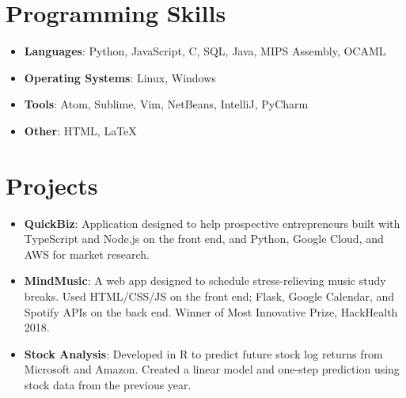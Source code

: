 \documentclass[letterpaper,12pt]{article}
\newcommand{\resumeItem}[2]{
  \item\small{
    \textbf{#1}{: #2 \vspace{-2pt}}
  }
}
\newcommand{\resumeSubItem}[2]{\resumeItem{#1}{#2}\vspace{-4pt}}
\newcommand{\resumeSubHeadingListStart}{\begin{itemize}[leftmargin=*]}
\newcommand{\resumeSubHeadingListEnd}{\end{itemize}}
\begin{document}
\section{Programming Skills}
  \resumeSubHeadingListStart
    \resumeSubItem{Languages}
      {Python, JavaScript, C, SQL, Java, MIPS Assembly, OCAML}
    \resumeSubItem{Operating Systems}
    {Linux, Windows}
    \resumeSubItem{Tools}
    {Atom, Sublime, Vim, NetBeans, IntelliJ, PyCharm}
    \resumeSubItem{Other}{HTML, \LaTeX}
  \resumeSubHeadingListEnd

\section{Projects}
  \resumeSubHeadingListStart
    \resumeSubItem{QuickBiz}
    {Application designed to help prospective entrepreneurs built with TypeScript and Node.js on the front end, and Python, Google Cloud, and AWS for market research.}
    \resumeSubItem{MindMusic}
      {A web app designed to schedule stress-relieving music study breaks.  Used HTML/CSS/JS on the front end; Flask, Google Calendar, and Spotify APIs on the back end.  Winner of Most Innovative Prize, HackHealth 2018.}
    \resumeSubItem{Stock Analysis}
      {Developed in R to predict future stock log returns from Microsoft and Amazon.  Created a linear model and one-step prediction using stock data from the previous year.}
  \resumeSubHeadingListEnd
  
\end{document}
